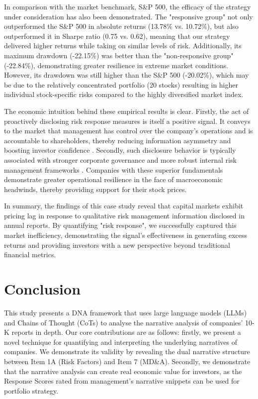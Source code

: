 \documentclass[sigconf]{acmart}
\begin{document}
In comparison with the market benchmark, S\&P 500, the efficacy of the strategy under consideration has also been demonstrated. The "responsive group" not only outperformed the S\&P 500 in absolute returns (13.78\% vs. 10.72\%), but also outperformed it in Sharpe ratio (0.75 vs. 0.62), meaning that our strategy delivered higher returns while taking on similar levels of risk.
Additionally, its maximum drawdown (-22.15\%) was better than the "non-responsive group" (-22.84\%), demonstrating greater resilience in extreme market conditions. 
However, its drawdown was still higher than the S\&P 500 (-20.02\%), which may be due to the relatively concentrated portfolio (20 stocks) resulting in higher individual stock-specific risks compared to the highly diversified market index. 

The economic intuition behind these empirical results is clear. Firstly, the act of proactively disclosing risk response measures is itself a positive signal. It conveys to the market that management has control over the company's operations and is accountable to shareholders, thereby reducing information asymmetry and boosting investor confidence \cite{healy2001information}. Secondly, such disclosure behavior is typically associated with stronger corporate governance and more robust internal risk management frameworks \cite{eng2003corporate, kim2024learning}. Companies with these superior fundamentals demonstrate greater operational resilience in the face of macroeconomic headwinds, thereby providing support for their stock prices.

In summary, the findings of this case study reveal that capital markets exhibit pricing lag in response to qualitative risk management information disclosed in annual reports. By quantifying "risk response", we successfully captured this market inefficiency, demonstrating the signal's effectiveness in generating excess returns and providing investors with a new perspective beyond traditional financial metrics.

\balance

\section{Conclusion}

This study presents a DNA framework that uses large language models (LLMs) and Chains of Thought (CoTs) to analyse the narrative analysis of companies' 10-K reports in depth. Our core contributions are as follows: firstly, we present a novel  technique for quantifying and interpreting the underlying narratives of companies. We demonstrate its validity by revealing the dual narrative structure between Item 1A (Risk Factors) and Item 7 (MD\&A). Secondly, we demonstrate that the narrative analysis can create real economic value for investors, as the Response Scores rated from management's narrative snippets can be used for portfolio strategy.
\end{document}
